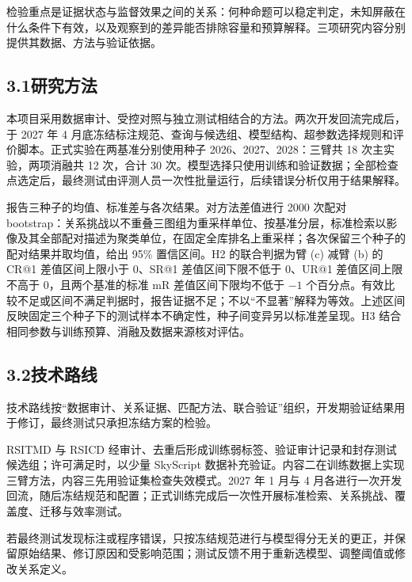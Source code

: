 检验重点是证据状态与监督效果之间的关系：何种命题可以稳定判定，未知屏蔽在什么条件下有效，以及观察到的差异能否排除容量和预算解释。三项研究内容分别提供其数据、方法与验证依据。



\subsection*{3.1\quad 研究方法}

本项目采用数据审计、受控对照与独立测试相结合的方法。两次开发回流完成后，于 2027 年 4 月底冻结标注规范、查询与候选组、模型结构、超参数选择规则和评价脚本。正式实验在两基准分别使用种子 2026、2027、2028：三臂共 18 次主实验，两项消融共 12 次，合计 30 次。模型选择只使用训练和验证数据；全部检查点选定后，最终测试由评测人员一次性批量运行，后续错误分析仅用于结果解释。

报告三种子的均值、标准差与各次结果。对方法差值进行 2000 次配对 bootstrap：关系挑战以不重叠三图组为重采样单位、按基准分层，标准检索以影像及其全部配对描述为聚类单位，在固定全库排名上重采样；各次保留三个种子的配对结果并取均值，给出 95\% 置信区间。H2 的联合判据为臂 (c) 减臂 (b) 的 CR@1 差值区间上限小于 0、SR@1 差值区间下限不低于 0、UR@1 差值区间上限不高于 0，且两个基准的标准 mR 差值区间下限均不低于 $-1$ 个百分点。有效比较不足或区间不满足判据时，报告证据不足；不以“不显著”解释为等效。上述区间反映固定三个种子下的测试样本不确定性，种子间变异另以标准差呈现。H3 结合相同参数与训练预算、消融及数据来源核对评估。

\subsection*{3.2\quad 技术路线}

技术路线按“数据审计、关系证据、匹配方法、联合验证”组织，开发期验证结果用于修订，最终测试只承担冻结方案的检验。

RSITMD 与 RSICD 经审计、去重后形成训练弱标签、验证审计记录和封存测试候选组；许可满足时，以少量 SkyScript\cite{wang2024skyscript} 数据补充验证。内容二在训练数据上实现三臂方法，内容三先用验证集检查失效模式。2027 年 1 月与 4 月各进行一次开发回流，随后冻结规范和配置；正式训练完成后一次性开展标准检索、关系挑战、覆盖度、迁移与效率测试。

若最终测试发现标注或程序错误，只按冻结规范进行与模型得分无关的更正，并保留原始结果、修订原因和受影响范围；测试反馈不用于重新选模型、调整阈值或修改关系定义。

